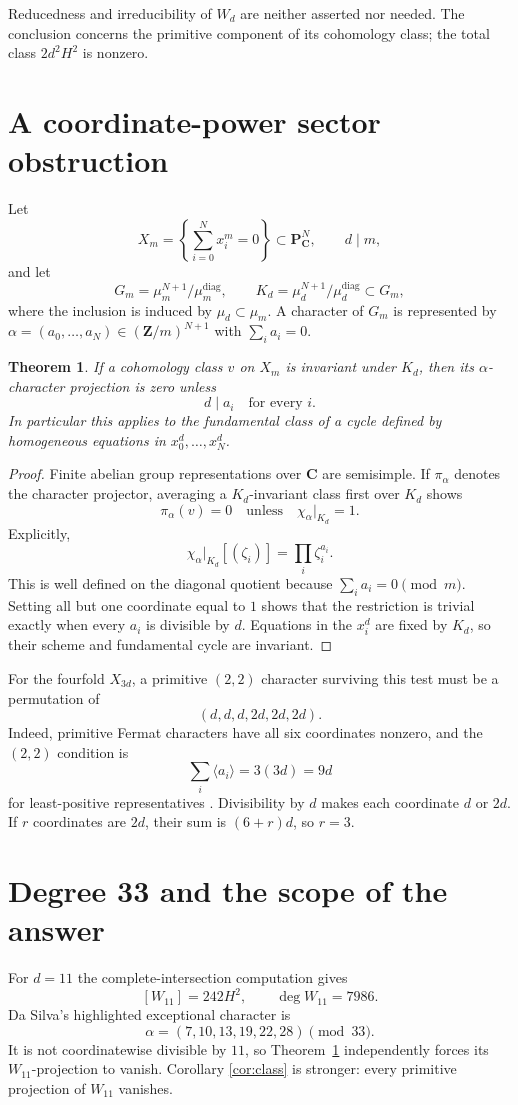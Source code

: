 \documentclass[11pt]{article}
\newtheorem{theorem}{Theorem}[section]
\begin{document}
Reducedness and irreducibility of $W_d$ are neither asserted nor needed.
The conclusion concerns the primitive component of its cohomology class; the
total class $2d^2H^2$ is nonzero.

\section{A coordinate-power sector obstruction}
Let
\[
 X_m=\left\{\sum_{i=0}^N x_i^m=0\right\}\subset\mathbf P^N_{\mathbf C},
 \qquad d\mid m,
\]
and let
\[
 G_m=\mu_m^{N+1}/\mu_m^{\mathrm{diag}},\qquad
 K_d=\mu_d^{N+1}/\mu_d^{\mathrm{diag}}\subset G_m,
\]
where the inclusion is induced by $\mu_d\subset\mu_m$.
A character of $G_m$ is represented by
$\alpha=(a_0,\ldots,a_N)\in(\mathbf Z/m)^{N+1}$ with
$\sum_i a_i=0$.

\begin{theorem}\label{thm:sector}
If a cohomology class $v$ on $X_m$ is invariant under $K_d$, then its
$\alpha$-character projection is zero unless
\[
 d\mid a_i\quad\text{for every }i.
\]
In particular this applies to the fundamental class of a cycle defined by
homogeneous equations in $x_0^d,\ldots,x_N^d$.
\end{theorem}
\begin{proof}
Finite abelian group representations over $\mathbf C$ are semisimple.  If
$\pi_\alpha$ denotes the character projector, averaging a $K_d$-invariant
class first over $K_d$ shows
\[
 \pi_\alpha(v)=0
 \quad\text{unless}\quad \chi_\alpha|_{K_d}=1.
\]
Explicitly,
\[
 \chi_\alpha|_{K_d}[(\zeta_i)]=\prod_i\zeta_i^{a_i}.
\]
This is well defined on the diagonal quotient because $\sum_i a_i=0\pmod m$.
Setting all but one coordinate equal to $1$ shows that the restriction is
trivial exactly when every $a_i$ is divisible by $d$.
Equations in the $x_i^d$ are fixed by $K_d$, so their scheme and fundamental
cycle are invariant.
\end{proof}

For the fourfold $X_{3d}$, a primitive $(2,2)$ character surviving this test
must be a permutation of
\[
 (d,d,d,2d,2d,2d).
\]
Indeed, primitive Fermat characters have all six coordinates nonzero, and the
$(2,2)$ condition is
\[
 \sum_i\langle a_i\rangle=3(3d)=9d
\]
for least-positive representatives \cite{Shioda}.  Divisibility by $d$ makes
each coordinate $d$ or $2d$.  If $r$ coordinates are $2d$, their sum is
$(6+r)d$, so $r=3$.

\section{Degree 33 and the scope of the answer}
For $d=11$ the complete-intersection computation gives
\[
 [W_{11}]=242H^2,\qquad \deg W_{11}=7986.
\]
Da Silva's highlighted exceptional character is
\[
 \alpha=(7,10,13,19,22,28)\pmod {33}.
\]
It is not coordinatewise divisible by $11$, so Theorem~\ref{thm:sector}
independently forces its $W_{11}$-projection to vanish.  Corollary
\ref{cor:class} is stronger: every primitive projection of $W_{11}$ vanishes.
\end{document}
